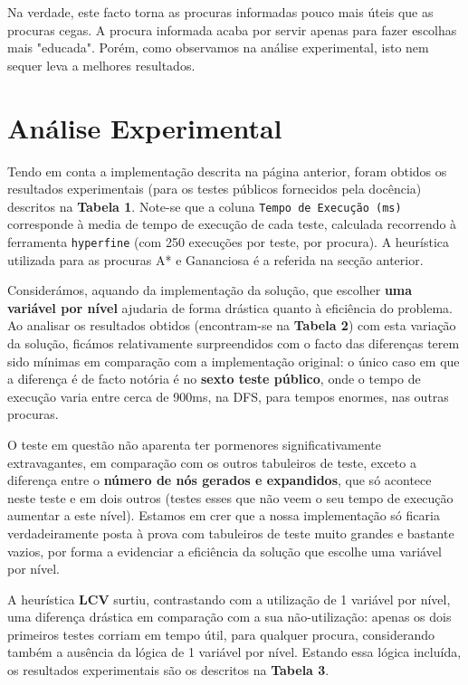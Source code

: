 \documentclass[12pt,a4paper]{article}
\begin{document}
Na verdade, este facto torna as procuras informadas pouco mais úteis que as procuras cegas.
A procura informada acaba por servir apenas para fazer escolhas mais "educada".
Porém, como observamos na análise experimental, isto nem sequer leva a melhores resultados.

\section*{Análise Experimental}

Tendo em conta a implementação descrita na página anterior, foram obtidos
os resultados experimentais (para os testes públicos fornecidos pela docência)
descritos na \textbf{Tabela 1}. Note-se que a coluna \texttt{Tempo de Execução (ms)}
corresponde à media de tempo de execução de cada teste, calculada recorrendo à ferramenta
\texttt{hyperfine} (com 250 execuções por teste, por procura). A heurística
utilizada para as procuras A* e Gananciosa é a referida na secção anterior.

Considerámos, aquando da implementação da solução, que escolher \textbf{uma variável por nível}
ajudaria de forma drástica quanto à eficiência do problema. Ao analisar os resultados
obtidos (encontram-se na \textbf{Tabela 2}) com esta variação da solução, ficámos
relativamente surpreendidos com o facto das diferenças terem sido mínimas em comparação
com a implementação original: o único caso em que a diferença é de facto notória
é no \textbf{sexto teste público}, onde o tempo de execução varia entre cerca de
900ms, na DFS, para tempos enormes, nas outras procuras.

O teste em questão não
aparenta ter pormenores significativamente extravagantes, em comparação com os
outros tabuleiros de teste, exceto a diferença entre o \textbf{número de nós gerados e expandidos},
que só acontece neste teste e em dois outros (testes esses que não
veem o seu tempo de execução aumentar a este nível).
Estamos em crer que a nossa implementação só ficaria verdadeiramente
posta à prova com tabuleiros de teste muito grandes e bastante vazios, por forma
a evidenciar a eficiência da solução que escolhe uma variável por nível.

A heurística \textbf{LCV} surtiu, contrastando com a utilização de 1 variável por nível,
uma diferença drástica em comparação com a sua não-utilização: apenas os
dois primeiros testes corriam em tempo útil, para qualquer procura, considerando
também a ausência da lógica de 1 variável por nível. Estando essa lógica
incluída, os resultados experimentais são os descritos na \textbf{Tabela 3}.
\end{document}
